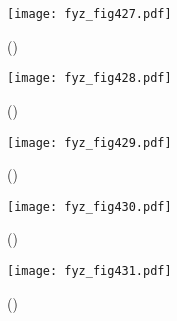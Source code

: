   \begin{figure}[ht!] %
    \centering
    \texttt{[image: fyz\_fig427.pdf]}
    \caption{
             (\cite[s.~697]{Feynman01})}
    \label{fyz:fig427}
  \end{figure}
  
  \begin{figure}[ht!] %
    \centering
    \texttt{[image: fyz\_fig428.pdf]}
    \caption{
             (\cite[s.~697]{Feynman01})}
    \label{fyz:fig428}
  \end{figure}

  \begin{figure}[ht!] %
    \centering
    \texttt{[image: fyz\_fig429.pdf]}
    \caption{
             (\cite[s.~697]{Feynman01})}
    \label{fyz:fig429}
  \end{figure}

  \begin{figure}[ht!] %
    \centering
    \texttt{[image: fyz\_fig430.pdf]}
    \caption{
             (\cite[s.~697]{Feynman01})}
    \label{fyz:fig430}
  \end{figure}

  \begin{figure}[ht!] %
    \centering
    \texttt{[image: fyz\_fig431.pdf]}
    \caption{
             (\cite[s.~697]{Feynman01})}
    \label{fyz:fig431}
  \end{figure}
  
  
\printbibliography[title={Seznam literatury}, heading=subbibliography]
